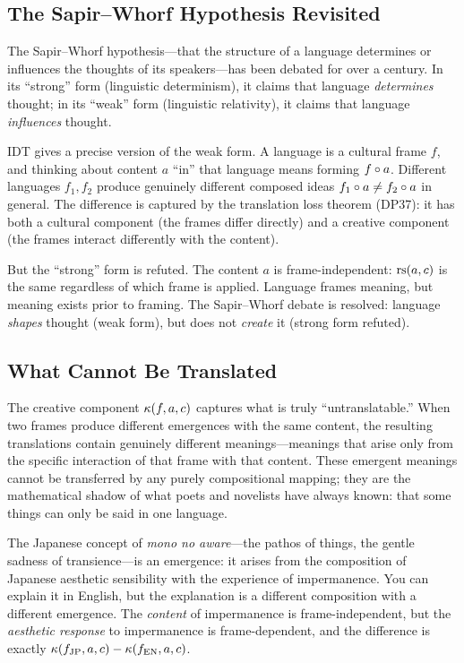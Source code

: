 \subsection{The Sapir--Whorf Hypothesis Revisited}

The Sapir--Whorf hypothesis---that the structure of a language determines or
influences the thoughts of its speakers---has been debated for over a century.
In its ``strong'' form (linguistic determinism), it claims that language
\emph{determines} thought; in its ``weak'' form (linguistic relativity), it
claims that language \emph{influences} thought.

IDT gives a precise version of the weak form.  A language is a cultural frame
$f$, and thinking about content $a$ ``in'' that language means forming
$f \circ a$.  Different languages $f_1, f_2$ produce genuinely different
composed ideas $f_1 \circ a \neq f_2 \circ a$ in general.  The difference
is captured by the translation loss theorem (DP37): it has both a cultural
component (the frames differ directly) and a creative component (the frames
interact differently with the content).

But the ``strong'' form is refuted.  The content $a$ is frame-independent:
$\mathrm{rs}(a, c)$ is the same regardless of which frame is applied.  Language
frames meaning, but meaning exists prior to framing.  The Sapir--Whorf debate
is resolved: language \emph{shapes} thought (weak form), but does not
\emph{create} it (strong form refuted).

\subsection{What Cannot Be Translated}

The creative component $\kappa(f, a, c)$ captures what is truly
``untranslatable.''  When two frames produce different emergences with the same
content, the resulting translations contain genuinely different meanings---meanings
that arise only from the specific interaction of that frame with that content.
These emergent meanings cannot be transferred by any purely compositional
mapping; they are the mathematical shadow of what poets and novelists have
always known: that some things can only be said in one language.

The Japanese concept of \textit{mono no aware}---the pathos of things, the
gentle sadness of transience---is an emergence: it arises from the composition
of Japanese aesthetic sensibility with the experience of impermanence.  You
can explain it in English, but the explanation is a different composition
with a different emergence.  The \emph{content} of impermanence is
frame-independent, but the \emph{aesthetic response} to impermanence is
frame-dependent, and the difference is exactly $\kappa(f_{\text{JP}}, a, c)
- \kappa(f_{\text{EN}}, a, c)$.

